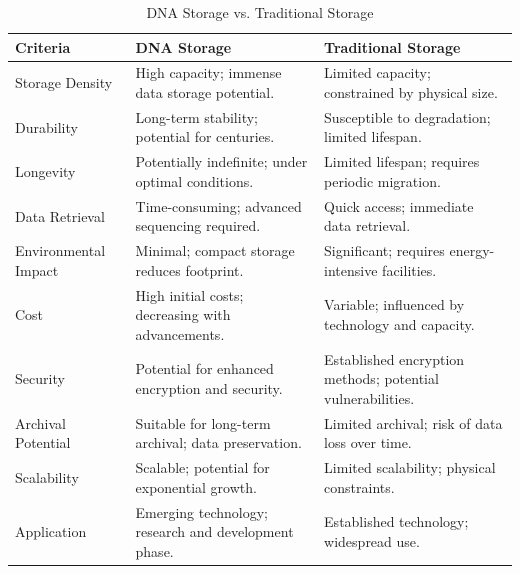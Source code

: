 \documentclass{article}
\begin{document}
\begin{table}[htbp]
  \centering
  \caption{DNA Storage vs. Traditional Storage}
  \label{tab:comparison}
  \begin{tabularx}{\textwidth}{llX}
    \toprule
    \textbf{Criteria} & \textbf{DNA Storage} & \textbf{Traditional Storage} \\
    \midrule
    Storage Density & High capacity; immense data storage potential. & Limited capacity; constrained by physical size. \\
    Durability & Long-term stability; potential for centuries. & Susceptible to degradation; limited lifespan. \\
    Longevity & Potentially indefinite; under optimal conditions. & Limited lifespan; requires periodic migration. \\
    Data Retrieval & Time-consuming; advanced sequencing required. & Quick access; immediate data retrieval. \\
    Environmental Impact & Minimal; compact storage reduces footprint. & Significant; requires energy-intensive facilities. \\
    Cost & High initial costs; decreasing with advancements. & Variable; influenced by technology and capacity. \\
    Security & Potential for enhanced encryption and security. & Established encryption methods; potential vulnerabilities. \\
    Archival Potential & Suitable for long-term archival; data preservation. & Limited archival; risk of data loss over time. \\
    Scalability & Scalable; potential for exponential growth. & Limited scalability; physical constraints. \\
    Application & Emerging technology; research and development phase. & Established technology; widespread use. \\
    \bottomrule
  \end{tabularx}
\end{table}
\end{document}
